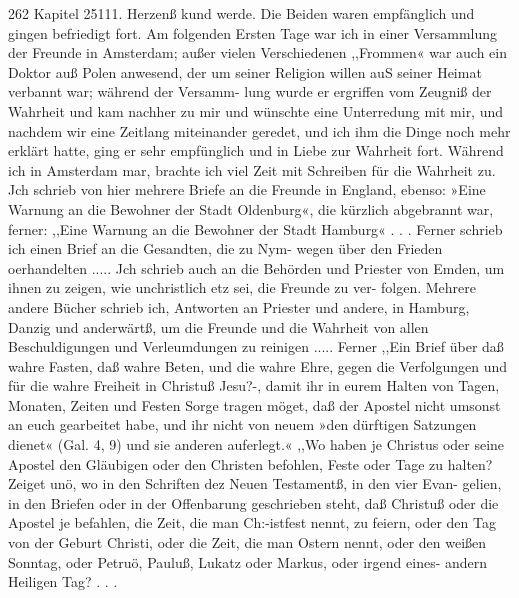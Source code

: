 262 Kapitel 25111.
Herzenß kund werde. Die Beiden waren empfänglich und gingen
befriedigt fort.
Am folgenden Ersten Tage war ich in einer Versammlung
der Freunde in Amsterdam; außer vielen Verschiedenen ,,Frommen«
war auch ein Doktor auß Polen anwesend, der um seiner Religion
willen auS seiner Heimat verbannt war; während der Versamm-
lung wurde er ergriffen vom Zeugniß der Wahrheit und kam
nachher zu mir und wünschte eine Unterredung mit mir, und
nachdem wir eine Zeitlang miteinander geredet, und ich ihm die
Dinge noch mehr erklärt hatte, ging er sehr empfünglich und in
Liebe zur Wahrheit fort.
Während ich in Amsterdam mar, brachte ich viel Zeit mit
Schreiben für die Wahrheit zu. Jch schrieb von hier mehrere Briefe
an die Freunde in England, ebenso: »Eine Warnung an die
Bewohner der Stadt Oldenburg«, die kürzlich abgebrannt war,
ferner: ,,Eine Warnung an die Bewohner der Stadt Hamburg« . . .
Ferner schrieb ich einen Brief an die Gesandten, die zu Nym-
wegen über den Frieden oerhandelten .....
Jch schrieb auch an die Behörden und Priester von Emden,
um ihnen zu zeigen, wie unchristlich etz sei, die Freunde zu ver-
folgen. Mehrere andere Bücher schrieb ich, Antworten an Priester
und andere, in Hamburg, Danzig und anderwärtß, um die Freunde
und die Wahrheit von allen Beschuldigungen und Verleumdungen
zu reinigen ..... Ferner ,,Ein Brief über daß wahre Fasten,
daß wahre Beten, und die wahre Ehre, gegen die Verfolgungen
und für die wahre Freiheit in Christuß Jesu?-, damit ihr in eurem
Halten von Tagen, Monaten, Zeiten und Festen Sorge tragen
möget, daß der Apostel nicht umsonst an euch gearbeitet habe,
und ihr nicht von neuem »den dürftigen Satzungen dienet«
(Gal. 4, 9) und sie anderen auferlegt.«
,,Wo haben je Christus oder seine Apostel den Gläubigen oder
den Christen befohlen, Feste oder Tage zu halten? Zeiget unö,
wo in den Schriften dez Neuen Testamentß, in den vier Evan-
gelien, in den Briefen oder in der Offenbarung geschrieben steht,
daß Christuß oder die Apostel je befahlen, die Zeit, die man
Ch:-istfest nennt, zu feiern, oder den Tag von der Geburt Christi,
oder die Zeit, die man Ostern nennt, oder den weißen Sonntag,
oder Petruö, Pauluß, Lukatz oder Markus, oder irgend eines-
andern Heiligen Tag? . . .


